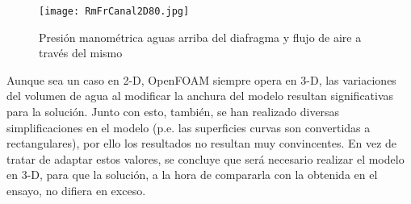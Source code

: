 \begin{figure}
\centering
\texttt{[image: RmFrCanal2D80.jpg]}
\caption[Presión manométrica y flujo de aire]{Presión manométrica aguas arriba del diafragma y flujo de aire a través del mismo}
\label{fig:RmFrCanal2D80}
\end{figure}

Aunque sea un caso en 2-D, OpenFOAM siempre opera en 3-D, las
variaciones del volumen de agua al modificar la anchura del modelo
resultan significativas para la solución. Junto con esto, también, se
han realizado diversas simplificaciones en el modelo (p.e. las
superficies curvas son convertidas a rectangulares), por ello los
resultados no resultan muy convincentes. En vez de tratar de adaptar
estos valores, se concluye que será necesario realizar el modelo en 3-D,
para que la solución, a la hora de compararla con la obtenida en el
ensayo, no difiera en exceso.
